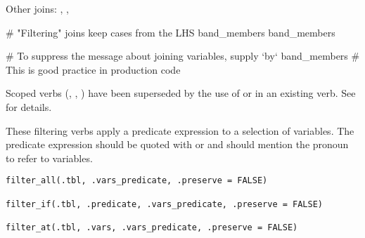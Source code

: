 \documentclass[a4paper]{book}
\begin{document}
%
\begin{SeeAlso}
Other joins: 
,
,
\end{SeeAlso}
%
\begin{Examples}
\begin{ExampleCode}
# "Filtering" joins keep cases from the LHS
band_members %
band_members %

# To suppress the message about joining variables, supply `by`
band_members %
# This is good practice in production code
\end{ExampleCode}
\end{Examples}
%
\begin{Description}
\strong{[Superseded]}

Scoped verbs (, , ) have been superseded by the use of
 or  in an existing verb. See  for
details.

These  filtering verbs apply a predicate expression to a
selection of variables. The predicate expression should be quoted
with  or  and should mention the pronoun
 to refer to variables.
\end{Description}
%
\begin{Usage}
\begin{verbatim}
filter_all(.tbl, .vars_predicate, .preserve = FALSE)

filter_if(.tbl, .predicate, .vars_predicate, .preserve = FALSE)

filter_at(.tbl, .vars, .vars_predicate, .preserve = FALSE)
\end{verbatim}
\end{Usage}
%
\end{document}
